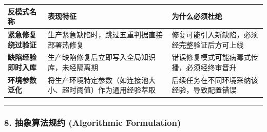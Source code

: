 {\def\LTcaptype{} %
\begin{longtable}[]{@{}
  >{\raggedright\arraybackslash}p{}
  >{\raggedright\arraybackslash}p{}
  >{\raggedright\arraybackslash}p{}@{}}
\toprule\noalign{}
\begin{minipage}[b]{\linewidth}\raggedright
反模式名称
\end{minipage} & \begin{minipage}[b]{\linewidth}\raggedright
表现特征
\end{minipage} & \begin{minipage}[b]{\linewidth}\raggedright
为什么必须杜绝
\end{minipage} \\
\midrule\noalign{}
\endhead
\bottomrule\noalign{}
\endlastfoot
\textbf{紧急修复绕过验证} & 生产紧急缺陷时，跳过五重判据直接部署热修复 &
修复可能引入新缺陷，必须经完整验证后方可上线 \\
\textbf{缺陷经验即时入库} & 生产缺陷修复后立即写入全局知识库，未经隔离期
& 错误修复模式可能病毒式传播，必须经终审晋升 \\
\textbf{环境参数泛化} &
将生产环境特定参数（如连接池大小、超时阈值）作为通用经验萃取 &
后续任务在不同环境采纳该经验，导致配置错误 \\
\end{longtable}
}

\begin{center}\rule{0.5\linewidth}{0.5pt}\end{center}

\subsubsection{8. 抽象算法规约 (Algorithmic
Formulation)}\label{ux62bdux8c61ux7b97ux6cd5ux89c4ux7ea6-algorithmic-formulation-22}

